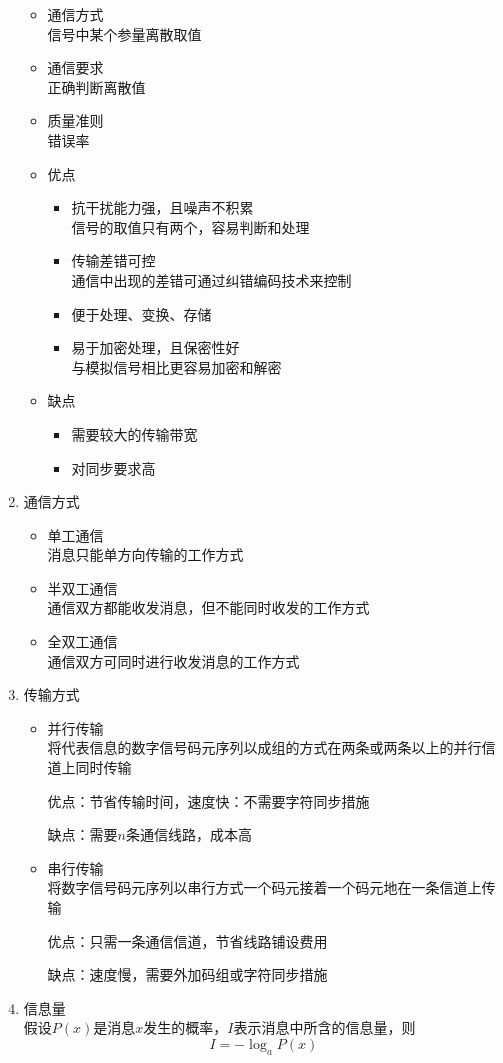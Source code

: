 \documentclass[UTF8]{ctexrep}
\begin{document}
\begin{enumerate}
\begin{itemize}
\item 通信方式\\
信号中某个参量离散取值
\item 通信要求\\
正确判断离散值
\item 质量准则\\
错误率
\item 优点
\begin{itemize}
\item 抗干扰能力强，且噪声不积累\\
信号的取值只有两个，容易判断和处理
\item 传输差错可控\\
通信中出现的差错可通过纠错编码技术来控制
\item 便于处理、变换、存储
\item 易于加密处理，且保密性好\\
与模拟信号相比更容易加密和解密
\end{itemize}
\item 缺点
\begin{itemize}
\item 需要较大的传输带宽
\item 对同步要求高
\end{itemize}
\end{itemize}
\item 通信方式
\begin{itemize}
\item 单工通信\\
消息只能单方向传输的工作方式
\item 半双工通信\\
通信双方都能收发消息，但不能同时收发的工作方式
\item 全双工通信\\
通信双方可同时进行收发消息的工作方式
\end{itemize}
\item 传输方式
\begin{itemize}
\item 并行传输\\
将代表信息的数字信号码元序列以成组的方式在两条或两条以上的并行信道上同时传输\par
优点：节省传输时间，速度快：不需要字符同步措施\par
缺点：需要$n$条通信线路，成本高
\item 串行传输\\
将数字信号码元序列以串行方式一个码元接着一个码元地在一条信道上传输\par
优点：只需一条通信信道，节省线路铺设费用\par
缺点：速度慢，需要外加码组或字符同步措施
\end{itemize}
\item 信息量\\
假设$P(x)$是消息$x$发生的概率，$I$表示消息中所含的信息量，则
\[
I=-\log_aP(x)
\]


\end{enumerate}
\end{document}
